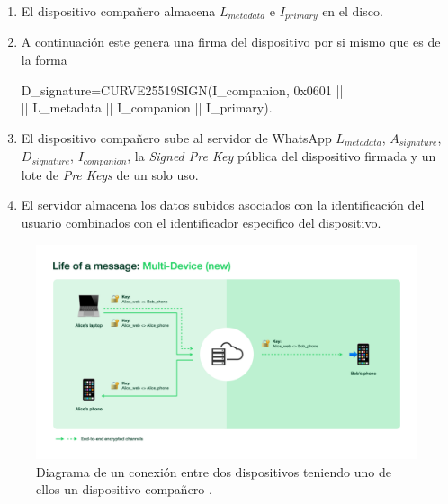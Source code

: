 \begin{description}
\begin{enumerate}
		\item El dispositivo compañero almacena $L_{metadata}$ e $I_{primary}$ en el disco.
		\item A continuación este genera una firma del dispositivo por si mismo que es de la forma 
		\begin{aligned}
			D_{signature}=CURVE25519\textunderscore SIGN(I_{companion}, 0x0601 || \\ || L_{metadata} || I_{companion} || I_{primary}).
		\end{aligned}

		\item El dispositivo compañero sube al servidor de WhatsApp $L_{metadata}$, $A_{signature}$, $D_{signature}$, $I_{companion}$, la \emph{Signed Pre Key} pública del dispositivo firmada y un lote de \emph{Pre Keys} de un solo uso.
		\item El servidor almacena los datos subidos asociados con la identificación del usuario combinados con el identificador especifico del dispositivo.
	\end{enumerate}
\end{description}


\begin{figure}[htb]
	\centering
	\includegraphics[scale=0.25]{imagenes/what1.png} 
	\caption{Diagrama de un conexión entre dos dispositivos teniendo uno de ellos un dispositivo compañero \cite{what1}.}
	\label{what1}
\end{figure}

